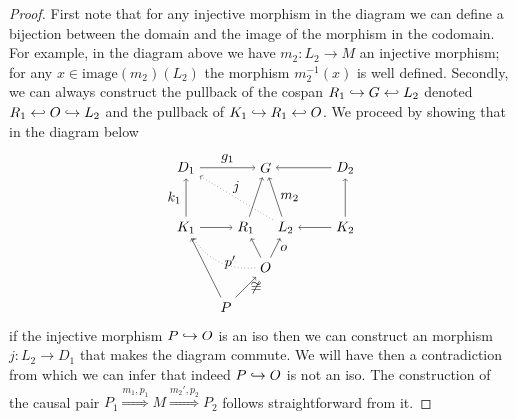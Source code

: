 \begin{proof}
  First note that for any injective morphism in the diagram we can define a bijection between the domain and the image of the morphism in the codomain. For example, in the diagram above we have $m_2:L_2\to M$ an injective morphism; for any $x\in \text{image}(m_2)(L_2)$ the morphism $m_2^{-1}(x)$ is well defined.
  Secondly, we can always construct the pullback of the cospan $R_1\hookrightarrow G\hookleftarrow L_2$ denoted $R_1\hookleftarrow O \hookrightarrow L_2$ and the pullback of $K_1\hookrightarrow R_1\hookleftarrow O$. We proceed by showing that in the diagram below
    \[
    \begin{tikzpicture} %
    \node (r1) at (1.5,0) {\(R_1\)};
    \node (m1) at (2,1.5) {\(G\)};
    \node (l2) at (2.5,0) {\(L_2\)};
    \node (d1) at (0,1.5) {\(D_1\)};
    \node (k1) at (0,0) {\(K_1\)};
    \node (d2) at (4,1.5) {\(D_2\)};
    \node (k2) at (4,0) {\(K_2\)};
    \node (o) at (2,-1) {\(O\)};
    \node (p) at (1,-2) {\(P\)};
    \draw [->] (k1) -- (r1);
    \draw [->] (k2) -- (l2);
    \draw [->] (k1) -- node [left,midway] {\(k_1\)} (d1);
    \draw [->] (k2) -- (d2);
    \draw [->] (d1) -- node [above,midway] {\(g_1\)} (m1);
    \draw [->] (d2) -- (m1);
    \draw [->] (l2) -- node [right,midway] {\(m_2\)} (m1);
    \draw [->] (r1) -- (m1);
    \draw [dotted,->] (l2) -- node [above,midway] {\(j\)} (d1);
    \draw [->] (p) -- (k1);
    \draw [->] (p) -- node [right,midway] {$\not\iso$} (o);
    \draw [->] (o) -- (r1);
    \draw [->] (o) -- node [right,midway] {$o$} (l2);
    \draw [dotted,->] (o) to [bend left] node [right,midway] {$p'$} (k1);
    \end{tikzpicture}
    \]
    if the injective morphism $P\hookrightarrow O$ is an iso then we can construct an morphism $j:L_2\to D_1$ that makes the diagram commute. We will have then a contradiction from which we can infer that indeed $P\hookrightarrow O$ is not an iso. The construction of the causal pair $P_1\overset{m_1,p_1}{\Rightarrow} M\overset{m_2',p_2}{\Rightarrow} P_2$ follows straightforward from it.


\end{proof}
